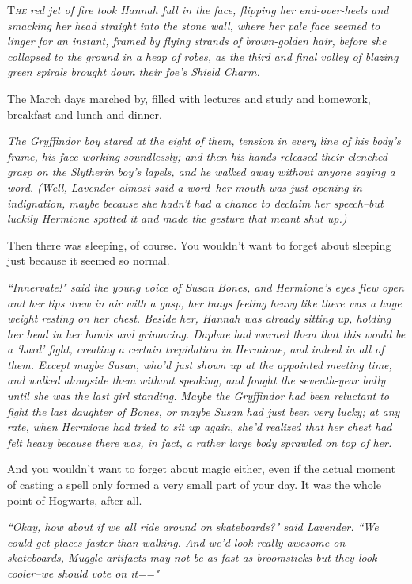 
\lettrine{T}{\emph{he}}\emph{ red jet of fire took Hannah full in the face, flipping her end-over-heels and smacking her head straight into the stone wall, where her pale face seemed to linger for an instant, framed by flying strands of brown-golden hair, before she collapsed to the ground in a heap of robes, as the third and final volley of blazing green spirals brought down their foe's Shield Charm.}

The March days marched by, filled with lectures and study and homework, breakfast and lunch and dinner.

\emph{The Gryffindor boy stared at the eight of them, tension in every line of his body's frame, his face working soundlessly; and then his hands released their clenched grasp on the Slytherin boy's lapels, and he walked away without anyone saying a word. (Well, Lavender almost said a word\---her mouth was just opening in indignation, maybe because she hadn't had a chance to declaim her speech\---but luckily Hermione spotted it and made the gesture that meant \emph{shut up}.)}

Then there was sleeping, of course. You wouldn't want to forget about sleeping just because it seemed so normal.

\emph{``Innervate!" said the young voice of Susan Bones, and Hermione's eyes flew open and her lips drew in air with a gasp, her lungs feeling heavy like there was a huge weight resting on her chest. Beside her, Hannah was already sitting up, holding her head in her hands and grimacing. Daphne had warned them that this would be a `hard' fight, creating a certain trepidation in Hermione, and indeed in all of them. Except maybe Susan, who'd just shown up at the appointed meeting time, and walked alongside them without speaking, and fought the seventh-year bully until she was the last girl standing. Maybe the Gryffindor had been reluctant to fight the last daughter of Bones, or maybe Susan had just been very lucky; at any rate, when Hermione had tried to sit up again, she'd realized that her chest had felt heavy because there was, in fact, a rather large body sprawled on top of her.}

And you wouldn't want to forget about magic either, even if the actual moment of casting a spell only formed a very small part of your day. It was the whole point of Hogwarts, after all.

\emph{``Okay, how about if we all ride around on skateboards?" said Lavender. ``We could get places faster than walking. And we'd look really awesome on skateboards, Muggle artifacts may not be as fast as broomsticks but they look cooler\---we should vote on it\==="}

